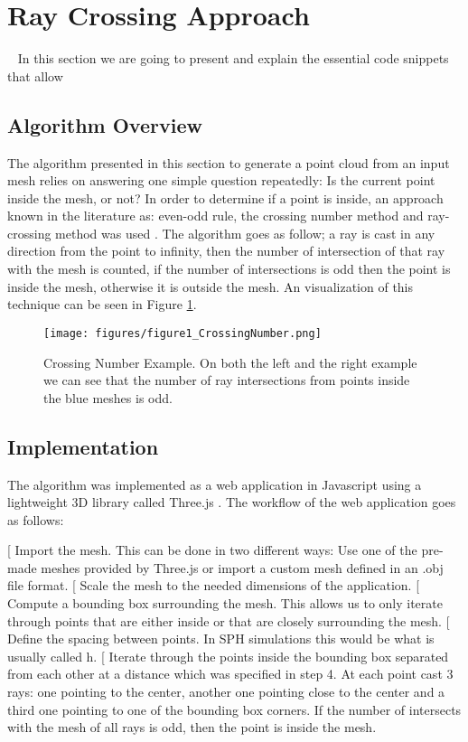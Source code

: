 \documentclass[12pt]{article}
\makeatletter
\newenvironment{steps}[1]{
\begin{enumerate}[label=#1 \arabic*, align=left, leftmargin=2.0cm]}{
\end{enumerate}}
\def\step{%
   \@ifnextchar[ \@step{\@noitemargtrue\@step[\@itemlabel]}}
\def\@step[#1]{\item[#1]\mbox{}\\\hspace{\labelsep}}
\makeatother
\begin{document}
\section{Ray Crossing Approach}\
\label{sec:raycrossingapproach}
In this section we are going to present and explain the essential code snippets that allow 

\subsection{Algorithm Overview}
\label{subsec:algorithmoverview}
The algorithm presented in this section to generate a point cloud from an input mesh relies on answering one simple question repeatedly: Is the current point inside the mesh, or not? In order to determine if a point is inside, an approach known in the literature as: even-odd rule, the crossing number method and ray-crossing method was used \cite{wiki, Sunday2012}. The algorithm goes as follow; a ray is cast in any direction from the point to infinity, then the number of intersection of that ray with the mesh is counted, if the number of intersections is odd then the point is inside the mesh, otherwise it is outside the mesh. An visualization of this technique can be seen in Figure \ref{fig:crossingnumberfigure}.

\begin{figure}[htp]
\centering
	\texttt{[image: figures/figure1\_CrossingNumber.png]}
	\caption{Crossing Number Example. On both the left and the right example we can see that the number of ray intersections from points inside the blue meshes is odd.}
	\label{fig:crossingnumberfigure}
\end{figure}

\subsection{Implementation}
\label{subsec:implementation}
The algorithm was implemented as a web application in Javascript using a lightweight 3D library called Three.js \cite{Three2015}. The workflow of the web application goes as follows:
\begin{steps}{Action}
\step Import the mesh. This can be done in two different ways: Use one of the pre-made meshes provided by Three.js or import a custom mesh defined in an .obj file format. 
\step Scale the mesh to the needed dimensions of the application.
\step Compute a bounding box surrounding the mesh. This allows us to only iterate through points that are either inside or that are closely surrounding the mesh.
\step Define the spacing between points. In SPH simulations this would be what is usually called h. 
\step Iterate through the points inside the bounding box separated from each other at a distance which was specified in step 4. At each point cast 3 rays: one pointing to the center, another one pointing close to the center and a third one pointing to one of the bounding box corners. If the number of intersects with the mesh of all rays is odd, then the point is inside the mesh.
\end{steps}
\end{document}
